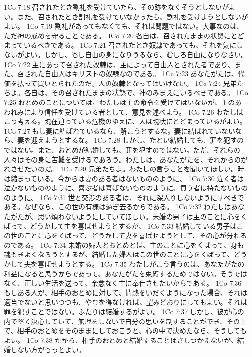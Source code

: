 1Co 7:18  召されたとき割礼を受けていたら、その跡をなくそうとしないがよい。また、召されたとき割礼を受けていなかったら、割礼を受けようとしないがよい。
1Co 7:19  割礼があってもなくても、それは問題ではない。大事なのは、ただ神の戒めを守ることである。
1Co 7:20  各自は、召されたままの状態にとどまっているべきである。
1Co 7:21  召されたとき奴隷であっても、それを気にしないがよい。しかし、もし自由の身になりうるなら、むしろ自由になりなさい。
1Co 7:22  主にあって召された奴隷は、主によって自由人とされた者であり、また、召された自由人はキリストの奴隷なのである。
1Co 7:23  あなたがたは、代価を払って買いとられたのだ。人の奴隷となってはいけない。
1Co 7:24  兄弟たちよ。各自は、その召されたままの状態で、神のみまえにいるべきである。
1Co 7:25  おとめのことについては、わたしは主の命令を受けてはいないが、主のあわれみにより信任を受けている者として、意見を述べよう。
1Co 7:26  わたしはこう考える。現在迫っている危機のゆえに、人は現状にとどまっているがよい。
1Co 7:27  もし妻に結ばれているなら、解こうとするな。妻に結ばれていないなら、妻を迎えようとするな。
1Co 7:28  しかし、たとい結婚しても、罪を犯すのではない。また、おとめが結婚しても、罪を犯すのではない。ただ、それらの人々はその身に苦難を受けるであろう。わたしは、あなたがたを、それからのがれさせたいのだ。
1Co 7:29  兄弟たちよ。わたしの言うことを聞いてほしい。時は縮まっている。今からは妻のある者はないもののように、
1Co 7:30  泣く者は泣かないもののように、喜ぶ者は喜ばないもののように、買う者は持たないもののように、
1Co 7:31  世と交渉のある者は、それに深入りしないようにすべきである。なぜなら、この世の有様は過ぎ去るからである。
1Co 7:32  わたしはあなたがたが、思い煩わないようにしていてほしい。未婚の男子は主のことに心をくばって、どうかして主を喜ばせようとするが、
1Co 7:33  結婚している男子はこの世のことに心をくばって、どうかして妻を喜ばせようとして、その心が分れるのである。
1Co 7:34  未婚の婦人とおとめとは、主のことに心をくばって、身も魂もきよくなろうとするが、結婚した婦人はこの世のことに心をくばって、どうかして夫を喜ばせようとする。
1Co 7:35  わたしがこう言うのは、あなたがたの利益になると思うからであって、あなたがたを束縛するためではない。そうではなく、正しい生活を送って、余念なく主に奉仕させたいからである。
1Co 7:36  もしある人が、相手のおとめに対して、情熱をいだくようになった場合、それは適当でないと思いつつも、やむを得なければ、望みどおりにしてもよい。それは罪を犯すことではない。ふたりは結婚するがよい。
1Co 7:37  しかし、彼が心の内で堅く決心していて、無理をしないで自分の思いを制することができ、その上で、相手のおとめをそのままにしておこうと、心の中で決めたなら、そうしてもよい。
1Co 7:38  だから、相手のおとめと結婚することはさしつかえないが、結婚しない方がもっとよい。
